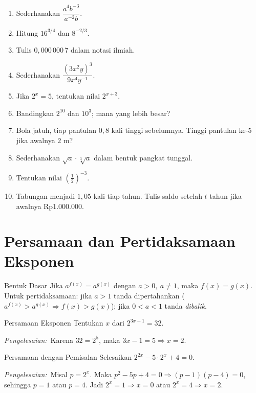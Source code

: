 \documentclass[11pt,a4paper]{report}
\theoremstyle{gaya}
\newcommand{\jawab}{\par\smallskip\noindent\textit{\textcolor{oranye}{Penyelesaian:}}\ }
\begin{document}
\begin{latihan}
\begin{enumerate}[leftmargin=*]
  \item Sederhanakan $\dfrac{a^4 b^{-3}}{a^{-2} b}$.
  \item Hitung $16^{3/4}$ dan $8^{-2/3}$.
  \item Tulis $0{,}000\,000\,7$ dalam notasi ilmiah.
  \item Sederhanakan $\dfrac{(3x^2y)^3}{9x^4y^{-1}}$.
  \item Jika $2^x=5$, tentukan nilai $2^{x+3}$.
  \item Bandingkan $2^{10}$ dan $10^3$; mana yang lebih besar?
  \item Bola jatuh, tiap pantulan $0{,}8$ kali tinggi sebelumnya. Tinggi pantulan ke-5 jika awalnya $2$ m?
  \item Sederhanakan $\sqrt{a}\cdot\sqrt[3]{a}$ dalam bentuk pangkat tunggal.
  \item Tentukan nilai $\left(\tfrac{1}{2}\right)^{-3}$.
  \item Tabungan menjadi $1{,}05$ kali tiap tahun. Tulis saldo setelah $t$ tahun jika awalnya Rp1.000.000.
\end{enumerate}
\end{latihan}

\section{Persamaan dan Pertidaksamaan Eksponen}
\begin{konsep}{Bentuk Dasar}
Jika $a^{f(x)} = a^{g(x)}$ dengan $a>0,\ a\neq 1$, maka $f(x)=g(x)$.\\[3pt]
Untuk pertidaksamaan: jika $a>1$ tanda dipertahankan ($a^{f(x)}>a^{g(x)}\Rightarrow f(x)>g(x)$); jika $0<a<1$ tanda \emph{dibalik}.
\end{konsep}

\begin{contoh}{Persamaan Eksponen}
Tentukan $x$ dari $2^{3x-1} = 32$.

\jawab Karena $32 = 2^5$, maka $3x-1 = 5 \Rightarrow x = 2$.
\end{contoh}

\begin{contoh}{Persamaan dengan Pemisalan}
Selesaikan $2^{2x}-5\cdot 2^x + 4 = 0$.

\jawab Misal $p=2^x$. Maka $p^2-5p+4=0\Rightarrow(p-1)(p-4)=0$, sehingga $p=1$ atau $p=4$. Jadi $2^x=1\Rightarrow x=0$ atau $2^x=4\Rightarrow x=2$.
\end{contoh}
\end{document}
